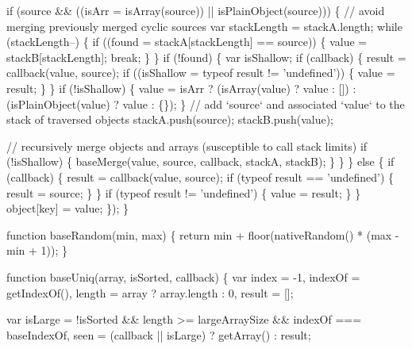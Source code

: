 \begin{DoxyCodeInclude}
        \textcolor{keywordflow}{if} (source && ((isArr = isArray(source)) || isPlainObject(source))) \{
          \textcolor{comment}{// avoid merging previously merged cyclic sources}
          var stackLength = stackA.length;
          \textcolor{keywordflow}{while} (stackLength--) \{
            \textcolor{keywordflow}{if} ((found = stackA[stackLength] == source)) \{
              value = stackB[stackLength];
              \textcolor{keywordflow}{break};
            \}
          \}
          \textcolor{keywordflow}{if} (!found) \{
            var isShallow;
            \textcolor{keywordflow}{if} (callback) \{
              result = callback(value, source);
              \textcolor{keywordflow}{if} ((isShallow = typeof result != \textcolor{stringliteral}{'undefined'})) \{
                value = result;
              \}
            \}
            \textcolor{keywordflow}{if} (!isShallow) \{
              value = isArr
                ? (isArray(value) ? value : [])
                : (isPlainObject(value) ? value : \{\});
            \}
            \textcolor{comment}{// add `source` and associated `value` to the stack of traversed objects}
            stackA.push(source);
            stackB.push(value);

            \textcolor{comment}{// recursively merge objects and arrays (susceptible to call stack limits)}
            \textcolor{keywordflow}{if} (!isShallow) \{
              baseMerge(value, source, callback, stackA, stackB);
            \}
          \}
        \}
        \textcolor{keywordflow}{else} \{
          \textcolor{keywordflow}{if} (callback) \{
            result = callback(value, source);
            \textcolor{keywordflow}{if} (typeof result == \textcolor{stringliteral}{'undefined'}) \{
              result = source;
            \}
          \}
          \textcolor{keywordflow}{if} (typeof result != \textcolor{stringliteral}{'undefined'}) \{
            value = result;
          \}
        \}
        \textcolor{keywordtype}{object}[key] = value;
      \});
    \}

    \textcolor{keyword}{function} baseRandom(min, max) \{
      \textcolor{keywordflow}{return} min + floor(nativeRandom() * (max - min + 1));
    \}

    \textcolor{keyword}{function} baseUniq(array, isSorted, callback) \{
      var index = -1,
          indexOf = getIndexOf(),
          length = array ? array.length : 0,
          result = [];

      var isLarge = !isSorted && length >= largeArraySize && indexOf === baseIndexOf,
          seen = (callback || isLarge) ? getArray() : result;


\end{DoxyCodeInclude}
